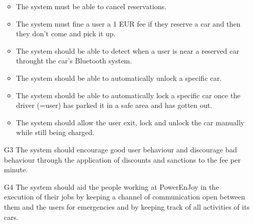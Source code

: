 \begin{itemize}
\begin{itemize}
			\item The system must be able to cancel reservations.
			\item The system must fine a user a 1 EUR fee if they reserve a car and then they don't come and pick it up.
			\item The system should be able to detect when a user is near a reserved car throught the car's Bluetooth system.
			\item The system should be able to automatically unlock a specific car.
			\item The system should be able to automatically lock a specific car once the driver (=user) has parked it in a safe area and has gotten out.
			\item The system should allow the user exit, lock and unlock the car manually while still being charged.
		\end{itemize}
	\item [G3] The system should encourage good user behaviour and discourage bad behaviour through the application of discounts and sanctions to the fee per minute. 
	\item [G4] The system should aid the people working at PowerEnJoy in the execution of their jobs by keeping a channel of communication open between them and the users for emergencies and by keeping track of all activities of its cars.  
\end{itemize}










